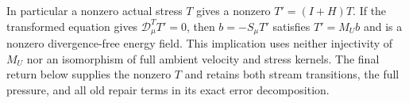 In particular a nonzero actual stress $T$ gives a nonzero
$T'=(I+H)T$. If the transformed equation gives
$\mathcal D_\mu^T T'=0$, then $b=-S_\mu T'$ satisfies
$T'=M_Ub$ and is a nonzero divergence-free energy field. This implication
uses neither injectivity of $M_U$ nor an isomorphism of full ambient
velocity and stress kernels. The final return below supplies the
nonzero $T$ and retains both stream transitions, the full pressure,
and all old repair terms in its exact error decomposition.
